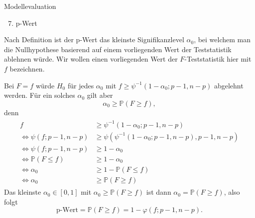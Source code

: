 \documentclass[
  8pt,
  ignorenonframetext,
]{beamer}
\providecommand{\tightlist}{%
  \setlength{\itemsep}{0pt}\setlength{\parskip}{0pt}}
\begin{document}
\begin{frame}{Modellevaluation}
\protect\hypertarget{modellevaluation-18}{}
\begin{enumerate}
[(1)]
\setcounter{enumi}{6}
\tightlist
\item
  p-Wert
\end{enumerate}

\footnotesize

Nach Definition ist der p-Wert das kleinste Signifikanzlevel
\(\alpha_0\), bei welchem man die Nullhypothese basierend auf einem
vorliegenden Wert der Teststatistik ablehnen würde. Wir wollen einen
vorliegenden Wert der \(F\)-Teststatistik hier mit \(f\) bezeichnen.

Bei \(F = f\) würde \(H_0\) für jedes \(\alpha_0\) mit
\(f \ge \psi^{-1}(1-\alpha_0;p-1,n-p)\) abgelehnt werden. Für ein
solches \(\alpha_0\) gilt aber \begin{equation}
\alpha_0 \ge \mathbb{P}(F \ge f),
\end{equation} denn \begin{align}
\begin{split}
f & \ge \psi^{-1}(1-\alpha_0;p-1,n-p) 
\\\Leftrightarrow
\psi(f;p-1,n-p) & \ge \psi(\psi^{-1}(1-\alpha_0;p-1,n-p), p-1,n-p) 
\\\Leftrightarrow
\psi(f;p-1,n-p) & \ge 1-\alpha_0 
\\\Leftrightarrow
\mathbb{P}(F \le f) & \ge 1-\alpha_0 
\\\Leftrightarrow
\alpha_0  & \ge 1 - \mathbb{P}(F \le f)
\\\Leftrightarrow
\alpha_0  & \ge \mathbb{P}(F \ge f)
\end{split}
\end{align} Das kleinste \(\alpha_0 \in [0,1]\) mit
\(\alpha_0 \ge \mathbb{P}(F \ge f)\) ist dann
\(\alpha_0 = \mathbb{P}(F \ge f)\), also folgt \begin{equation}
\mbox{p-Wert} = \mathbb{P}(F \ge f) = 1 - \varphi(f; p-1, n-p).
\end{equation}
\end{frame}
\end{document}
